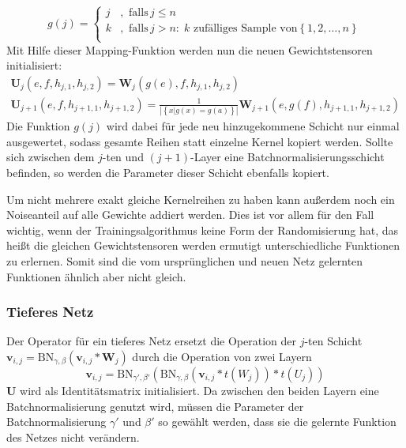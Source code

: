 \begin{equation}
 g(j) =  
 \begin{cases}
 j & , \text{ falls} \, j \leq n \\
 k & , \text{ falls} \, j>n : \;  k \text{ zufälliges Sample von} \left\{ 1,2,\ldots, n \right\} \\ 
 \end{cases} 
 \end{equation}
 Mit Hilfe dieser Mapping-Funktion werden nun die neuen Gewichtstensoren initialisiert:
 \begin{align*}
 \mathbf{U}_j(e,f,h_{j,1},h_{j,2}) = \mathbf{W}_j(g(e),f,h_{j,1},h_{j,2}) \\
 \mathbf{U}_{j+1}(e,f,h_{j+1,1},h_{j+1,2})= \frac{1}{|\left\{ x | g(x)=g(a)\right\}|}\mathbf{W}_{j+1}(e,g(f),h_{j+1,1},h_{j+1,2})
 \end{align*}
Die Funktion $g(j)$ wird dabei für jede neu hinzugekommene Schicht nur einmal ausgewertet, sodass gesamte Reihen statt einzelne Kernel kopiert werden. Sollte sich zwischen dem $j$-ten und $(j+1)$-Layer eine Batchnormalisierungsschicht befinden, so werden die Parameter dieser Schicht ebenfalls kopiert.

Um nicht mehrere exakt gleiche Kernelreihen zu haben kann außerdem noch ein Noiseanteil auf alle Gewichte addiert werden. Dies ist vor allem für den Fall wichtig, wenn der Trainingsalgorithmus keine Form der Randomisierung hat, das heißt die gleichen Gewichtstensoren werden ermutigt unterschiedliche Funktionen zu erlernen. Somit sind die vom ursprünglichen und neuen Netz gelernten Funktionen ähnlich aber nicht gleich.

\subsubsection{Tieferes Netz}

Der Operator für ein tieferes Netz ersetzt die Operation der $j$-ten Schicht $\mathbf{v}_{i,j} = \text{BN}_{\gamma,\beta}( \mathbf{v}_{i,j}* \mathbf{W}_{j})$ durch die Operation von zwei Layern  
\begin{equation}
\mathbf{v}_{i,j} =\text{BN}_{\gamma',\beta'}( \text{BN}_{\gamma,\beta}( \mathbf{v}_{i,j} * t(W_{j})) * t(U_{j})    )
\end{equation}
$\mathbf{U}$ wird als Identitätsmatrix initialisiert.
Da zwischen den beiden Layern eine Batchnormalisierung genutzt wird, müssen die Parameter der Batchnormalisierung $\gamma'$ und $\beta'$ so gewählt werden, dass sie die gelernte Funktion des Netzes nicht verändern.


